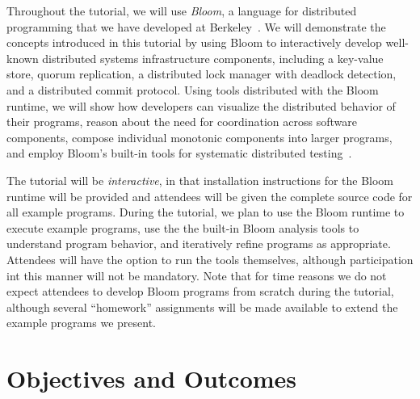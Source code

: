 Throughout the tutorial, we will use \emph{Bloom}, a language for distributed
programming that we have developed at Berkeley~\cite{bloom-website}. We will
demonstrate the concepts introduced in this tutorial by using Bloom to interactively 
develop well-known distributed systems infrastructure components, including a key-value
store, quorum replication, a distributed lock manager with deadlock detection,
and a distributed commit protocol. Using tools distributed with the Bloom
runtime, we will show how developers can visualize the distributed behavior of
their programs, reason about the need for coordination across software components, compose
individual monotonic components into larger programs, and employ Bloom's
built-in tools for systematic distributed testing~\cite{Alvaro2012}.

The tutorial will be \emph{interactive}, in that installation instructions for
the Bloom runtime will be provided and attendees will be given the complete
source code for all example programs. During the tutorial, we plan to use the
Bloom runtime to execute example programs, use the the built-in Bloom analysis
tools to understand program behavior, and iteratively refine programs as
appropriate. Attendees will have the option to run the tools themselves,
although participation int this manner will not be mandatory. Note that for time
reasons we do not expect attendees to develop Bloom programs from scratch during
the tutorial, although several ``homework'' assignments will be made available
to extend the example programs we present.

\section{Objectives and Outcomes}

